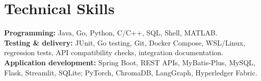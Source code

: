 \documentclass[11pt,a4paper]{article}
\begin{document}
\section*{Technical Skills}
\textbf{Programming:} Java, Go, Python, C/C++, SQL, Shell, MATLAB.\\
\textbf{Testing \& delivery:} JUnit, Go testing, Git, Docker Compose, WSL/Linux, regression tests, API compatibility checks, integration documentation.\\
\textbf{Application development:} Spring Boot, REST APIs, MyBatis-Plus, MySQL, Flask, Streamlit, SQLite; PyTorch, ChromaDB, LangGraph, Hyperledger Fabric.
\end{document}
